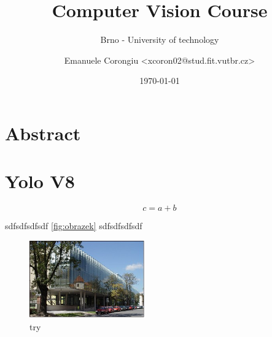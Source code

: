 \documentclass[12pt]{article}
\title{Computer Vision Course}
\subtitle{Brno - University of technology}
\author{Emanuele Corongiu <xcoron02@stud.fit.vutbr.cz>}
\date{\today}
\begin{document}
\maketitle

\section{Abstract}



\section{Yolo V8}



\begin{equation}
  \label{moje-rovnice}
  c = a + b
\end{equation}

sdfsdfsdfsdf \ref{fig:obrazek} sdfsdfsdfsdf

\begin{figure}[htb]
  \centering
  \includegraphics[width=5cm,keepaspectratio]{obrazek.jpg}
  \caption{try \cite{wikipedia}}
  \label{fig:try}
\end{figure}






\begin{flushleft}
  
\end{flushleft}

\end{document}
